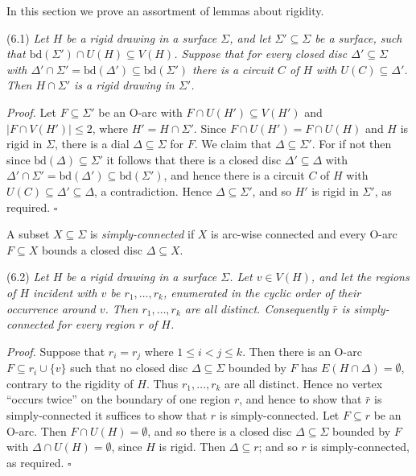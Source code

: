 
In this section we prove an assortment of lemmas about rigidity.

\stmt
(6.1) \textit{Let $H$ be a rigid drawing in a surface $\Sigma$, and let $\Sigma' \subseteq \Sigma$ be a surface, such that $\text{bd}(\Sigma') \cap U(H) \subseteq V(H)$. Suppose that for every closed disc $\Delta' \subseteq \Sigma$ with $\Delta' \cap \Sigma' = \text{bd}(\Delta') \subseteq \text{bd}(\Sigma')$ there is a circuit $C$ of $H$ with $U(C) \subseteq \Delta'$. Then $H \cap \Sigma'$ is a rigid drawing in $\Sigma'$.}

\textit{Proof.} Let $F \subseteq \Sigma'$ be an O-arc with $F \cap U(H') \subseteq V(H')$ and $|F \cap V(H')| \le 2$, where $H' = H \cap \Sigma'$. Since $F \cap U(H') = F \cap U(H)$ and $H$ is rigid in $\Sigma$, there is a dial $\Delta \subseteq \Sigma$ for $F$. We claim that $\Delta \subseteq \Sigma'$. For if not then since $\text{bd}(\Delta) \subseteq \Sigma'$ it follows that there is a closed disc $\Delta' \subseteq \Delta$ with $\Delta' \cap \Sigma' = \text{bd}(\Delta') \subseteq \text{bd}(\Sigma')$, and hence there is a circuit $C$ of $H$ with $U(C) \subseteq \Delta' \subseteq \Delta$, a contradiction. Hence $\Delta \subseteq \Sigma'$, and so $H'$ is rigid in $\Sigma'$, as required. $\square$

A subset $X \subseteq \Sigma$ is \textit{simply-connected} if $X$ is arc-wise connected and every O-arc $F \subseteq X$ bounds a closed disc $\Delta \subseteq X$.

\stmt
(6.2) \textit{Let $H$ be a rigid drawing in a surface $\Sigma$. Let $v \in V(H)$, and let the regions of $H$ incident with $v$ be $r_1, \dots, r_k$, enumerated in the cyclic order of their occurrence around $v$. Then $r_1, \dots, r_k$ are all distinct. Consequently $\bar{r}$ is simply-connected for every region $r$ of $H$.}

\textit{Proof.} Suppose that $r_i = r_j$ where $1 \le i < j \le k$. Then there is an O-arc $F \subseteq r_i \cup \{v\}$ such that no closed disc $\Delta \subseteq \Sigma$ bounded by $F$ has $E(H \cap \Delta) = \emptyset$, contrary to the rigidity of $H$. Thus $r_1, \dots, r_k$ are all distinct. Hence no vertex ``occurs twice'' on the boundary of one region $r$, and hence to show that $\bar{r}$ is simply-connected it suffices to show that $r$ is simply-connected. Let $F \subseteq r$ be an O-arc. Then $F \cap U(H) = \emptyset$, and so there is a closed disc $\Delta \subseteq \Sigma$ bounded by $F$ with $\Delta \cap U(H) = \emptyset$, since $H$ is rigid. Then $\Delta \subseteq r$; and so $r$ is simply-connected, as required. $\square$

